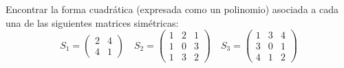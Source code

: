 \documentclass[twocolumn]{notasdeclase}
\begin{document}
\begin{ejer}
	Encontrar la forma cuadrática (expresada como un polinomio) asociada a cada una de las siguientes matrices simétricas:
	\[ S_1=\begin{pmatrix}
	2 & 4 \\ 4 & 1
	\end{pmatrix} \quad S_2=\begin{pmatrix}
	1 & 2 &1 \\
	1 & 0 & 3 \\
	1 & 3 & 2
	\end{pmatrix}\quad S_3=\begin{pmatrix}
	1 & 3 &4 \\
	3 & 0 & 1\\
	4 & 1 & 2
	\end{pmatrix} \]
\end{ejer}
\end{document}
